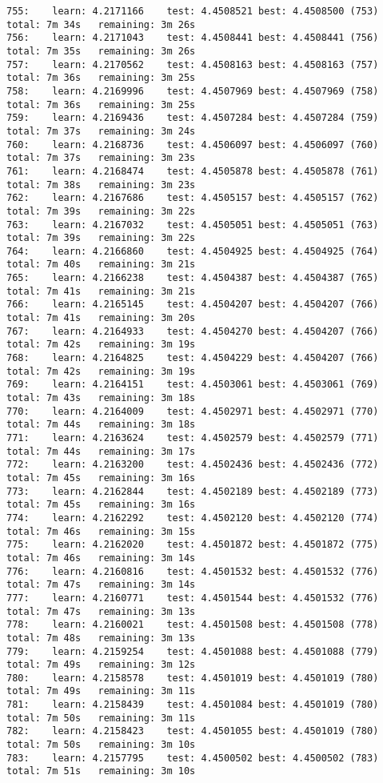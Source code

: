 \documentclass[11pt]{article}
\begin{document}
\begin{Verbatim}[commandchars=\\\{\}]
755:	learn: 4.2171166	test: 4.4508521	best: 4.4508500 (753)	total: 7m 34s	remaining: 3m 26s
756:	learn: 4.2171043	test: 4.4508441	best: 4.4508441 (756)	total: 7m 35s	remaining: 3m 26s
757:	learn: 4.2170562	test: 4.4508163	best: 4.4508163 (757)	total: 7m 36s	remaining: 3m 25s
758:	learn: 4.2169996	test: 4.4507969	best: 4.4507969 (758)	total: 7m 36s	remaining: 3m 25s
759:	learn: 4.2169436	test: 4.4507284	best: 4.4507284 (759)	total: 7m 37s	remaining: 3m 24s
760:	learn: 4.2168736	test: 4.4506097	best: 4.4506097 (760)	total: 7m 37s	remaining: 3m 23s
761:	learn: 4.2168474	test: 4.4505878	best: 4.4505878 (761)	total: 7m 38s	remaining: 3m 23s
762:	learn: 4.2167686	test: 4.4505157	best: 4.4505157 (762)	total: 7m 39s	remaining: 3m 22s
763:	learn: 4.2167032	test: 4.4505051	best: 4.4505051 (763)	total: 7m 39s	remaining: 3m 22s
764:	learn: 4.2166860	test: 4.4504925	best: 4.4504925 (764)	total: 7m 40s	remaining: 3m 21s
765:	learn: 4.2166238	test: 4.4504387	best: 4.4504387 (765)	total: 7m 41s	remaining: 3m 21s
766:	learn: 4.2165145	test: 4.4504207	best: 4.4504207 (766)	total: 7m 41s	remaining: 3m 20s
767:	learn: 4.2164933	test: 4.4504270	best: 4.4504207 (766)	total: 7m 42s	remaining: 3m 19s
768:	learn: 4.2164825	test: 4.4504229	best: 4.4504207 (766)	total: 7m 42s	remaining: 3m 19s
769:	learn: 4.2164151	test: 4.4503061	best: 4.4503061 (769)	total: 7m 43s	remaining: 3m 18s
770:	learn: 4.2164009	test: 4.4502971	best: 4.4502971 (770)	total: 7m 44s	remaining: 3m 18s
771:	learn: 4.2163624	test: 4.4502579	best: 4.4502579 (771)	total: 7m 44s	remaining: 3m 17s
772:	learn: 4.2163200	test: 4.4502436	best: 4.4502436 (772)	total: 7m 45s	remaining: 3m 16s
773:	learn: 4.2162844	test: 4.4502189	best: 4.4502189 (773)	total: 7m 45s	remaining: 3m 16s
774:	learn: 4.2162292	test: 4.4502120	best: 4.4502120 (774)	total: 7m 46s	remaining: 3m 15s
775:	learn: 4.2162020	test: 4.4501872	best: 4.4501872 (775)	total: 7m 46s	remaining: 3m 14s
776:	learn: 4.2160816	test: 4.4501532	best: 4.4501532 (776)	total: 7m 47s	remaining: 3m 14s
777:	learn: 4.2160771	test: 4.4501544	best: 4.4501532 (776)	total: 7m 47s	remaining: 3m 13s
778:	learn: 4.2160021	test: 4.4501508	best: 4.4501508 (778)	total: 7m 48s	remaining: 3m 13s
779:	learn: 4.2159254	test: 4.4501088	best: 4.4501088 (779)	total: 7m 49s	remaining: 3m 12s
780:	learn: 4.2158578	test: 4.4501019	best: 4.4501019 (780)	total: 7m 49s	remaining: 3m 11s
781:	learn: 4.2158439	test: 4.4501084	best: 4.4501019 (780)	total: 7m 50s	remaining: 3m 11s
782:	learn: 4.2158423	test: 4.4501055	best: 4.4501019 (780)	total: 7m 50s	remaining: 3m 10s
783:	learn: 4.2157795	test: 4.4500502	best: 4.4500502 (783)	total: 7m 51s	remaining: 3m 10s

\end{Verbatim}
\end{document}
